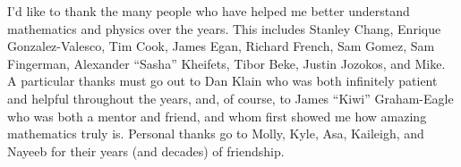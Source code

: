 I'd like to thank the many people who have helped me better understand
mathematics and physics over the years. This includes Stanley Chang,
Enrique Gonzalez-Valesco, Tim Cook, James Egan, Richard French, Sam Gomez,
Sam Fingerman, Alexander ``Sasha'' Kheifets, Tibor Beke, Justin Jozokos, and
Mike. A particular thanks must go out to Dan Klain who was both infinitely
patient and helpful throughout the years, and, of course, to James ``Kiwi''
Graham-Eagle who was both a mentor and friend, and whom first showed me how
amazing mathematics truly is. Personal thanks go to Molly, Kyle, Asa, Kaileigh,
and Nayeeb for their years (and decades) of friendship.